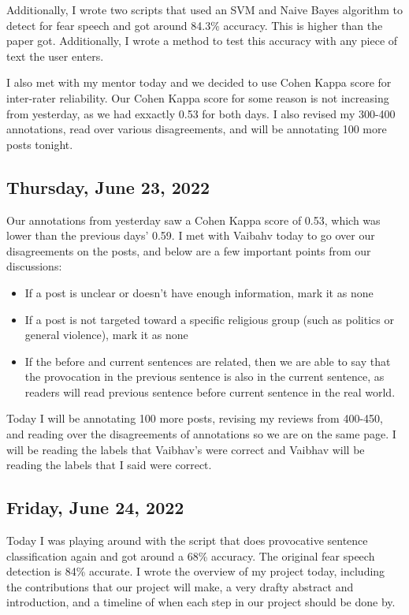 \documentclass[11pt,letterpaper]{article}
\begin{document}
Additionally, I wrote two scripts that used an SVM and Naive Bayes algorithm to detect for fear speech and got around 84.3\% accuracy. This is higher than the paper got. Additionally, I wrote a method to test this accuracy with any piece of text the user enters.

I also met with my mentor today and we decided to use Cohen Kappa score for inter-rater reliability. Our Cohen Kappa score for some reason is not increasing from yesterday, as we had exxactly 0.53 for both days. I also revised my 300-400 annotations, read over various disagreements, and will be annotating 100 more posts tonight.

\subsection{Thursday, June 23, 2022}
Our annotations from yesterday saw a Cohen Kappa score of 0.53, which was lower than the previous days' 0.59. I met with Vaibahv today to go over our disagreements on the posts, and below are a few important points from our discussions:
\begin{itemize}
    \item If a post is unclear or doesn't have enough information, mark it as none
    \item If a post is not targeted toward a specific religious group (such as politics or general violence), mark it as none
    \item If the before and current sentences are related, then we are able to say that the provocation in the previous sentence is also in the current sentence, as readers will read previous sentence before current sentence in the real world.
\end{itemize}

Today I will be annotating 100 more posts, revising my reviews from 400-450, and reading over the disagreements of annotations so we are on the same page. I will be reading the labels that Vaibhav's were correct and Vaibhav will be reading the labels that I said were correct.


\subsection{Friday, June 24, 2022}
Today I was playing around with the script that does provocative sentence classification again and got around a 68\% accuracy. The original fear speech detection is 84\% accurate. I wrote the overview of my project today, including the contributions that our project will make, a very drafty abstract and introduction, and a timeline of when each step in our project should be done by.
\end{document}
